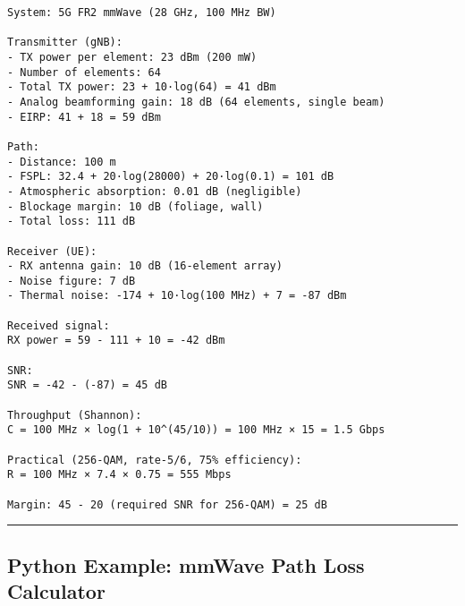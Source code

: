 \begin{verbatim}
System: 5G FR2 mmWave (28 GHz, 100 MHz BW)

Transmitter (gNB):
- TX power per element: 23 dBm (200 mW)
- Number of elements: 64
- Total TX power: 23 + 10·log(64) = 41 dBm
- Analog beamforming gain: 18 dB (64 elements, single beam)
- EIRP: 41 + 18 = 59 dBm

Path:
- Distance: 100 m
- FSPL: 32.4 + 20·log(28000) + 20·log(0.1) = 101 dB
- Atmospheric absorption: 0.01 dB (negligible)
- Blockage margin: 10 dB (foliage, wall)
- Total loss: 111 dB

Receiver (UE):
- RX antenna gain: 10 dB (16-element array)
- Noise figure: 7 dB
- Thermal noise: -174 + 10·log(100 MHz) + 7 = -87 dBm

Received signal:
RX power = 59 - 111 + 10 = -42 dBm

SNR:
SNR = -42 - (-87) = 45 dB

Throughput (Shannon):
C = 100 MHz × log(1 + 10^(45/10)) = 100 MHz × 15 = 1.5 Gbps

Practical (256-QAM, rate-5/6, 75% efficiency):
R = 100 MHz × 7.4 × 0.75 = 555 Mbps

Margin: 45 - 20 (required SNR for 256-QAM) = 25 dB 
\end{verbatim}

\begin{center}\rule{0.5\linewidth}{0.5pt}\end{center}

\subsection{\texorpdfstring{ Python Example: mmWave Path Loss
Calculator}{ Python Example: mmWave Path Loss Calculator}}\label{python-example-mmwave-path-loss-calculator}

